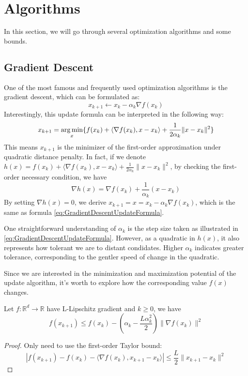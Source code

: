 \chapter{Algorithms}

In this section, we will go through several optimization algorithms and some bounds.

\section{Gradient Descent}
One of the most famous and frequently used optimization algorithms is the gradient descent, which can be formulated as:
\begin{equation}\label{eq:GradientDescentUpdateFormula}
    x_{k+1} \leftarrow x_k - \alpha_k\nabla f(x_k)
\end{equation}
Interestingly, this update formula can be interpreted in the following way:
\begin{equation*}
    x_{k+1} = \operatorname*{arg\,min}_x \{ f(x_k) + \langle \nabla f(x_k), x-x_k \rangle + \frac{1}{2\alpha_k}\|x-x_k\|^2 \}
\end{equation*}
This means $x_{k+1}$ is the minimizer of the first-order approximation under quadratic distance penalty. In fact, if we denote $h(x) = f(x_k) + \langle \nabla f(x_k), x-x_k \rangle + \frac{1}{2\alpha_k}\|x-x_k\|^2$, by checking the first-order necessary condition, we have 
\begin{equation*}
    \nabla h(x) = \nabla f(x_k) + \frac{1}{\alpha_k}(x - x_k)
\end{equation*}
By setting $\nabla h(x) = 0$, we derive $x_{k+1} = x = x_k - \alpha_k\nabla f(x_k)$, which is the same as formula \ref{eq:GradientDescentUpdateFormula}.

\begin{note}
    One straightforward understanding of $\alpha_k$ is the step size taken as illustrated in \ref{eq:GradientDescentUpdateFormula}. However, as a quadratic in $h(x)$, it also represents how tolerant we are to distant condidates. Higher $\alpha_k$ indicates greater tolerance, corresponding to the gentler speed of change in the quadratic. 
\end{note}

Since we are interested in the minimization and maximization potential of the update algorithm, it's worth to explore how the corresponding value $f(x)$ changes. 
\begin{lemma}\label{lemma:DescentLemma}
    Let $f: \mathbb{R}^d \rightarrow \mathbb{R}$ have L-Lipschitz gradient and $k \geq 0$, we have
    \begin{equation*}
        f(x_{k+1}) \leq f(x_k) - (\alpha_k - \frac{L\alpha_k^2}{2}) \| \nabla f(x_k) \|^2
    \end{equation*}
\end{lemma}
\begin{proof}
    Only need to use the first-order Taylor bound:
    \begin{equation*}
        | f(x_{k+1}) - f(x_k) - \langle \nabla f(x_k), x_{k+1} - x_k \rangle | \leq \frac{L}{2}\|x_{k+1} - x_k\|^2
    \end{equation*}
\end{proof}

